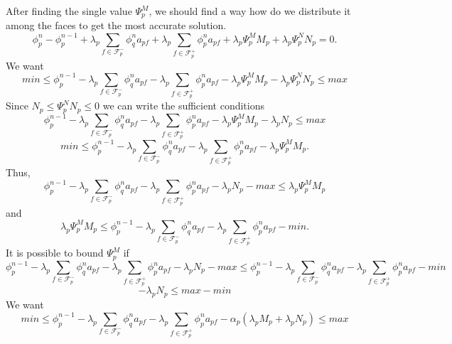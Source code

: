 \documentclass[../thesis.tex]{subfiles}
\begin{document}
After finding the single value \(\Psi_p^M\),
we should find a way how do we distribute it
among the faces to get the most accurate solution.
\begin{equation}
    \phi^{n}_p - \phi_p^{n-1}
    + \lambda_p \sum_{f \in \mathcal{F}_p^-} \phi_q^{n} a_{pf}
    + \lambda_p \sum_{f \in \mathcal{F}_p^+} \phi_p^{n} a_{pf}
    +\lambda_p \Psi_p^M M_p + \lambda_p \Psi_p^N N_p
    = 0.
\end{equation}
We want
\[
    min
    \leq
    \phi_p^{n-1}
    - \lambda_p \sum_{f \in \mathcal{F}_p^-} \phi_q^{n} a_{pf}
    - \lambda_p \sum_{f \in \mathcal{F}_p^+} \phi_p^{n} a_{pf}
    - \lambda_p \Psi_p^M M_p - \lambda_p \Psi_p^N N_p
    \leq
    max
\]
Since \( N_p \leq \Psi_p^N N_p \leq 0 \) we can write the
sufficient conditions
\[
    \phi_p^{n-1}
    - \lambda_p \sum_{f \in \mathcal{F}_p^-} \phi_q^{n} a_{pf}
    - \lambda_p \sum_{f \in \mathcal{F}_p^+} \phi_p^{n} a_{pf}
    - \lambda_p \Psi_p^M M_p - \lambda_p N_p
    \leq
    max
\]
\[
    min
    \leq
    \phi_p^{n-1}
    - \lambda_p \sum_{f \in \mathcal{F}_p^-} \phi_q^{n} a_{pf}
    - \lambda_p \sum_{f \in \mathcal{F}_p^+} \phi_p^{n} a_{pf}
    - \lambda_p \Psi_p^M M_p.
\]
Thus,
\[
    \phi_p^{n-1}
    - \lambda_p \sum_{f \in \mathcal{F}_p^-} \phi_q^{n} a_{pf}
    - \lambda_p \sum_{f \in \mathcal{F}_p^+} \phi_p^{n} a_{pf}
    - \lambda_p N_p - max
    \leq
    \lambda_p \Psi_p^M M_p
\]
and
\[
    \lambda_p \Psi_p^M M_p
    \leq
    \phi_p^{n-1}
    - \lambda_p \sum_{f \in \mathcal{F}_p^-} \phi_q^{n} a_{pf}
    - \lambda_p \sum_{f \in \mathcal{F}_p^+} \phi_p^{n} a_{pf}
    - min.
\]
It is possible to bound \(\Psi_p^M\) if
\[
    \phi_p^{n-1}
    - \lambda_p \sum_{f \in \mathcal{F}_p^-} \phi_q^{n} a_{pf}
    - \lambda_p \sum_{f \in \mathcal{F}_p^+} \phi_p^{n} a_{pf}
    - \lambda_p N_p - max
    \leq
    \phi_p^{n-1}
    - \lambda_p \sum_{f \in \mathcal{F}_p^-} \phi_q^{n} a_{pf}
    - \lambda_p \sum_{f \in \mathcal{F}_p^+} \phi_p^{n} a_{pf}
    - min
\]
\[
    - \lambda_p N_p
    \leq
    max - min
\]
\newpage
We want
\[
    min
    \leq
    \phi_p^{n-1}
    - \lambda_p \sum_{f \in \mathcal{F}_p^-} \phi_q^{n} a_{pf}
    - \lambda_p \sum_{f \in \mathcal{F}_p^+} \phi_p^{n} a_{pf}
    - \alpha_p \left( \lambda_p M_p + \lambda_p N_p \right)
    \leq
    max
\]
\end{document}
